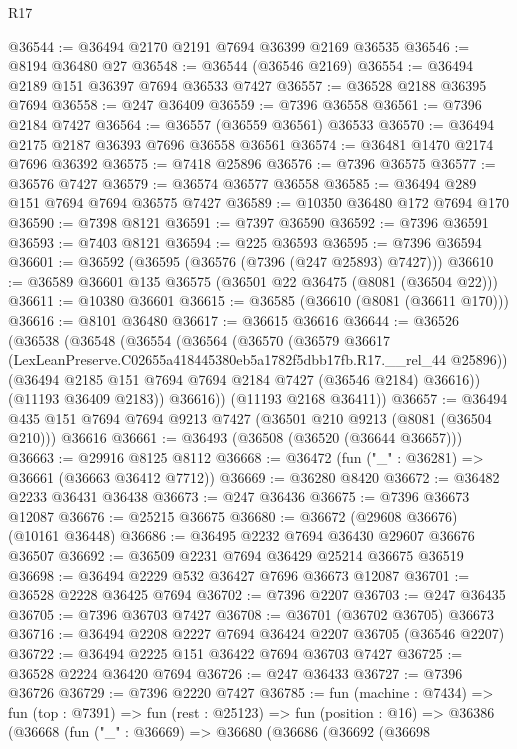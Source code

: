 \begin{lexlean}{R17}
\begin{coremodule}
@36544 := @36494 @2170 @2191 @7694 @36399 @2169 @36535
@36546 := @8194 @36480 @27
@36548 := @36544 (@36546 @2169)
@36554 := @36494 @2189 @151 @36397 @7694 @36533 @7427
@36557 := @36528 @2188 @36395 @7694
@36558 := @247 @36409
@36559 := @7396 @36558
@36561 := @7396 @2184 @7427
@36564 := @36557 (@36559 @36561) @36533
@36570 := @36494 @2175 @2187 @36393 @7696 @36558 @36561
@36574 := @36481 @1470 @2174 @7696 @36392
@36575 := @7418 @25896
@36576 := @7396 @36575
@36577 := @36576 @7427
@36579 := @36574 @36577 @36558
@36585 := @36494 @289 @151 @7694 @7694 @36575 @7427
@36589 := @10350 @36480 @172 @7694 @170
@36590 := @7398 @8121
@36591 := @7397 @36590
@36592 := @7396 @36591
@36593 := @7403 @8121
@36594 := @225 @36593
@36595 := @7396 @36594
@36601 := @36592 (@36595 (@36576 (@7396 (@247 @25893) @7427)))
@36610 := @36589 @36601 @135 @36575 (@36501 @22 @36475 (@8081 (@36504 @22)))
@36611 := @10380 @36601
@36615 := @36585 (@36610 (@8081 (@36611 @170)))
@36616 := @8101 @36480
@36617 := @36615 @36616
@36644 := @36526
    (@36538
      (@36548
        (@36554
          (@36564
            (@36570
              (@36579
                @36617
                (LexLeanPreserve.C02655a418445380eb5a1782f5dbb17fb.R17.__rel_44 @25896))
              (@36494 @2185 @151 @7694 @7694 @2184 @7427 (@36546 @2184) @36616))
            (@11193 @36409 @2183))
          @36616))
      (@11193 @2168 @36411))
@36657 := @36494 @435 @151 @7694 @7694 @9213 @7427 (@36501 @210 @9213 (@8081 (@36504 @210))) @36616
@36661 := @36493 (@36508 (@36520 (@36644 @36657)))
@36663 := @29916 @8125 @8112
@36668 := @36472 (fun ("_" : @36281) => @36661 (@36663 @36412 @7712))
@36669 := @36280 @8420
@36672 := @36482 @2233 @36431 @36438
@36673 := @247 @36436
@36675 := @7396 @36673 @12087
@36676 := @25215 @36675
@36680 := @36672 (@29608 @36676) (@10161 @36448)
@36686 := @36495 @2232 @7694 @36430 @29607 @36676 @36507
@36692 := @36509 @2231 @7694 @36429 @25214 @36675 @36519
@36698 := @36494 @2229 @532 @36427 @7696 @36673 @12087
@36701 := @36528 @2228 @36425 @7694
@36702 := @7396 @2207
@36703 := @247 @36435
@36705 := @7396 @36703 @7427
@36708 := @36701 (@36702 @36705) @36673
@36716 := @36494 @2208 @2227 @7694 @36424 @2207 @36705 (@36546 @2207)
@36722 := @36494 @2225 @151 @36422 @7694 @36703 @7427
@36725 := @36528 @2224 @36420 @7694
@36726 := @247 @36433
@36727 := @7396 @36726
@36729 := @7396 @2220 @7427
@36785 := fun (machine : @7434) =>
  fun (top : @7391) =>
  fun (rest : @25123) =>
  fun (position : @16) =>
  @36386
    (@36668
      (fun ("_" : @36669) =>
      @36680
        (@36686
          (@36692
            (@36698

\end{coremodule}
\end{lexlean}
